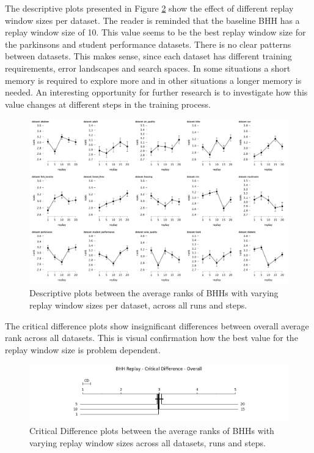 The descriptive plots presented in Figure \ref{fig:results:replay:descriptive:cd} show the effect of different replay window sizes per dataset. The reader is reminded that the baseline \Ac{BHH} has a replay window size of 10. This value seems to be the best replay window size for the parkinsons and student performance datasets. There is no clear patterns between datasets. This makes sense, since each dataset has different training requirements, error landscapes and search spaces. In some situations a short memory is required to explore more and in other situations a longer memory is needed. An interesting opportunity for further research is to investigate how this value changes at different steps in the training process. 

\begin{figure}[htbp]
	\centering
	\includegraphics[width=\textwidth]{analysis/bhh_replay/figures/descriptive/descriptive.png}
	\caption{Descriptive plots between the average ranks of \Acsp{BHH} with varying replay window sizes per dataset, across all runs and steps.}
	\label{fig:results:replay:descriptive:descriptive}
\end{figure}

The critical difference plots show insignificant differences between overall average rank across all datasets. This is visual confirmation how the best value for the replay window size is problem dependent. 

\begin{figure}[htbp]
	\centering
	\includegraphics[width=\textwidth]{analysis/bhh_replay/figures/cd/overall.png}
	\caption{Critical Difference plots between the average ranks of \Acsp{BHH} with varying replay window sizes across all datasets, runs and steps.}
	\label{fig:results:replay:descriptive:cd}
\end{figure}


